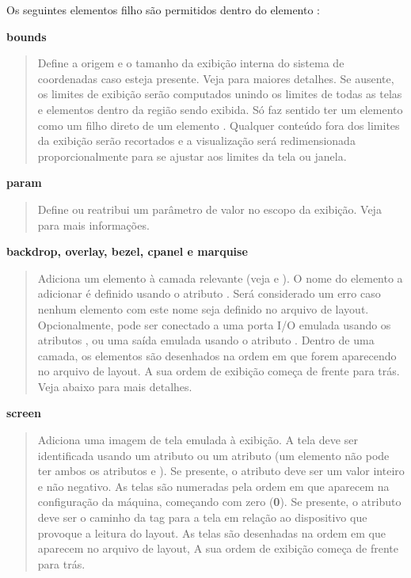 \documentclass[letterpaper,10pt,brazil]{sphinxmanual}
\begin{document}
Os seguintes elementos filho são permitidos dentro do elemento :

\textbf{bounds}
\begin{quote}

Define a origem e o tamanho da exibição interna do sistema de
coordenadas caso esteja presente.
Veja {\hyperref[techspecs/layout_files:layout\string-concepts\string-coordinates]{}} para maiores detalhes.
Se ausente, os limites de exibição serão computados unindo os
limites de todas as telas e elementos dentro da região sendo
exibida. Só faz sentido ter um elemento  como um filho
direto de um elemento . Qualquer conteúdo fora dos limites
da exibição serão recortados e a visualização será redimensionada
proporcionalmente para se ajustar aos limites da tela ou janela.
\end{quote}

\textbf{param}
\begin{quote}

Define ou reatribui um parâmetro de valor no escopo da exibição. Veja
{\hyperref[techspecs/layout_files:layout\string-concepts\string-params]{}} para mais informações.
\end{quote}

\textbf{backdrop, overlay, bezel, cpanel e marquise}
\begin{quote}

Adiciona um elemento à camada relevante
(veja {\hyperref[techspecs/layout_files:layout\string-parts]{}} e {\hyperref[techspecs/layout_files:layout\string-concepts\string-layers]{}}).
O nome do elemento a adicionar é definido usando o atributo
. Será considerado um erro caso nenhum elemento com este
nome seja definido no arquivo de layout. Opcionalmente, pode ser
conectado a uma porta I/O emulada usando os atributos ,
 ou uma saída emulada usando o atributo .
Dentro de uma camada, os elementos são desenhados na ordem em que
forem aparecendo no arquivo de layout. A sua ordem de exibição
começa de frente para trás.
Veja abaixo para mais detalhes.
\end{quote}

\textbf{screen}
\begin{quote}

Adiciona uma imagem de tela emulada à exibição. A tela deve ser
identificada usando um atributo  ou um atributo 
(um elemento  não pode ter ambos os atributos  e
).
Se presente, o atributo  deve ser um valor inteiro e não
negativo. As telas são numeradas pela ordem em que aparecem na
configuração da máquina, começando com zero (\textbf{0}). Se presente, o
atributo  deve ser o caminho da tag para a tela em relação ao
dispositivo que provoque a leitura do layout. As telas são
desenhadas na ordem em que aparecem no arquivo de layout, A sua
ordem de exibição começa de frente para trás.
\end{quote}
\end{document}
